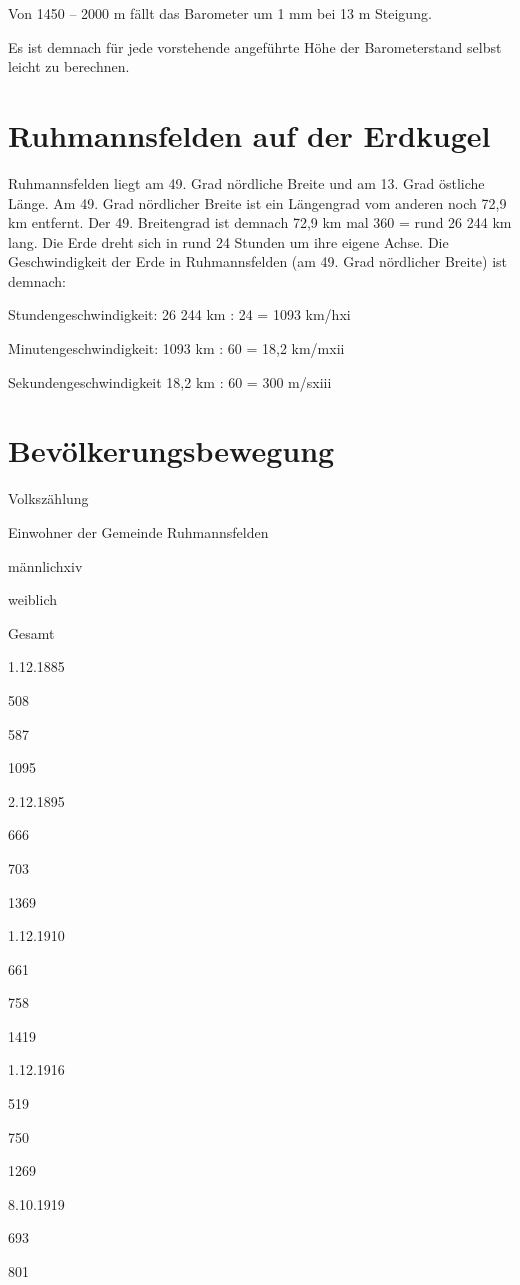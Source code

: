 \documentclass[12pt,a4pager]{book}
\begin{document}
Von 1450 – 2000 m fällt das Barometer um 1 mm bei 13 m Steigung.

Es ist demnach für jede vorstehende angeführte Höhe der Barometerstand selbst
leicht zu berechnen.

\chapter{Ruhmannsfelden auf der Erdkugel}

Ruhmannsfelden liegt am 49. Grad nördliche Breite und am 13. Grad östliche
Länge. Am 49. Grad nördlicher Breite ist ein Längengrad vom anderen noch 72,9 km
entfernt. Der 49. Breitengrad ist demnach 72,9 km mal 360 = rund 26 244 km lang.
Die Erde dreht sich in rund 24 Stunden um ihre eigene Achse. Die Geschwindigkeit
der Erde in Ruhmannsfelden (am 49. Grad nördlicher Breite) ist demnach:

Stundengeschwindigkeit: 26 244 km : 24 = 1093 km/hxi

Minutengeschwindigkeit: 1093 km : 60 = 18,2 km/mxii

Sekundengeschwindigkeit 18,2 km : 60 = 300 m/sxiii

\chapter{Bevölkerungsbewegung}

Volkszählung

Einwohner der Gemeinde Ruhmannsfelden

männlichxiv

weiblich

Gesamt

1.12.1885

508

587

1095

2.12.1895

666

703

1369

1.12.1910

661

758

1419

1.12.1916

519

750

1269

8.10.1919

693

801
\end{document}
